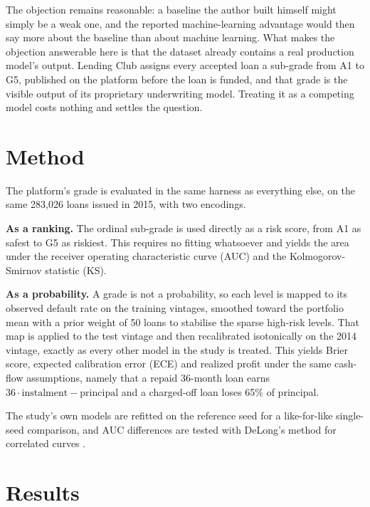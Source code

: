 \documentclass[a4paper,twocolumn,10pt]{article}
\begin{document}
The objection remains reasonable: a baseline the author built himself might simply be a weak one, and the reported machine-learning advantage would then say more about the baseline than about machine learning. What makes the objection answerable here is that the dataset already contains a real production model's output. Lending Club assigns every accepted loan a sub-grade from A1 to G5, published on the platform before the loan is funded, and that grade is the visible output of its proprietary underwriting model. Treating it as a competing model costs nothing and settles the question.

\section{Method}

The platform's grade is evaluated in the same harness as everything else, on the same 283{,}026 loans issued in 2015, with two encodings.

\textbf{As a ranking.} The ordinal sub-grade is used directly as a risk score, from A1 as safest to G5 as riskiest. This requires no fitting whatsoever and yields the area under the receiver operating characteristic curve (AUC) and the Kolmogorov-Smirnov statistic (KS).

\textbf{As a probability.} A grade is not a probability, so each level is mapped to its observed default rate on the training vintages, smoothed toward the portfolio mean with a prior weight of 50 loans to stabilise the sparse high-risk levels. That map is applied to the test vintage and then recalibrated isotonically on the 2014 vintage, exactly as every other model in the study is treated. This yields Brier score, expected calibration error (ECE) and realized profit under the same cash-flow assumptions, namely that a repaid 36-month loan earns $36\cdot\text{instalment}-\text{principal}$ and a charged-off loan loses 65\% of principal.

The study's own models are refitted on the reference seed for a like-for-like single-seed comparison, and AUC differences are tested with DeLong's method for correlated curves \cite{delong1988}.

\section{Results}
\end{document}
